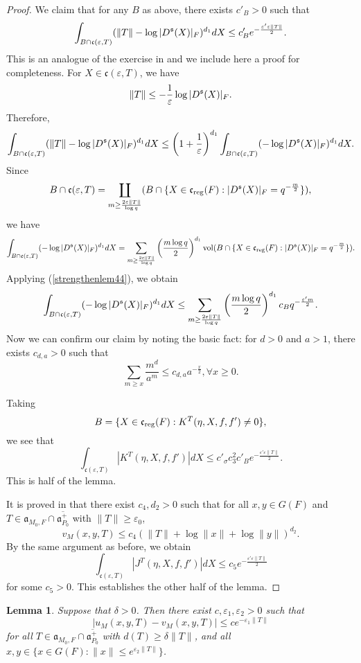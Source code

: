 \documentclass[a4paper]{amsart}
\newcommand{\fa}{{\mathfrak{a}}} \newcommand{\fb}{{\mathfrak{b}}}\newcommand{\fc}{{\mathfrak{c}}} \newcommand{\fd}{{\mathfrak{d}}}
\newcommand{\ov}{\overline}
\newcommand{\vol}{{\mathrm{vol}}}                   \newcommand{\Vol}{{\mathrm{Vol}}}
\newtheorem{lem}[thm]{Lemma}
\theoremstyle{definition}
\theoremstyle{remark}
\numberwithin{equation}{subsection}
\begin{document}
\begin{proof}
We claim that for any $B$ as above, there exists $c'_B>0$ such that
$$ \int_{B\cap\fc(\varepsilon, T)} (\| T\| - \log |D^\fs(X)|_F)^{d_1} dX \leq c'_B e^{-\frac{\varepsilon'\varepsilon\| T\|}{2}}. $$
This is an analogue of the exercise in \cite[p. 32]{MR1114210} and we include here a proof for completeness. For $X\in\fc(\varepsilon,T)$, we have
$$ \|T\|\leq-\frac{1}{\varepsilon}\log|D^{\mathfrak{s}}(X)|_F. $$
Therefore, 
$$ \int_{B\cap\fc(\varepsilon, T)} (\| T\| - \log |D^\fs(X)|_F)^{d_1} dX \leq \left(1+\frac{1}{\varepsilon}\right)^{d_1}\int_{B\cap\fc(\varepsilon, T)} (- \log |D^\fs(X)|_F)^{d_1} dX. $$
Since
$$ B\cap\fc(\varepsilon, T)=\coprod_{m\geq\frac{2\varepsilon\|T\|}{\log q}} (B\cap\{X\in\fc_\reg(F): |D^\fs(X)|_F=q^{-\frac{m}{2}}\}), $$
we have
$$ \int_{B\cap\fc(\varepsilon, T)} (- \log |D^\fs(X)|_F)^{d_1} dX=\sum_{m\geq\frac{2\varepsilon\|T\|}{\log q}} \left(\frac{m\log q}{2}\right)^{d_1} \vol(B\cap\{X\in\fc_\reg(F): |D^\fs(X)|_F=q^{-\frac{m}{2}}\}). $$
Applying (\ref{strengthenlem44}), we obtain
$$ \int_{B\cap\fc(\varepsilon, T)} (- \log |D^\fs(X)|_F)^{d_1} dX \leq \sum_{m\geq\frac{2\varepsilon\|T\|}{\log q}} \left(\frac{m\log q}{2}\right)^{d_1} c_B q^{-\frac{\varepsilon'm}{2}}. $$
Now we can confirm our claim by noting the basic fact: for $d>0$ and $a>1$, there exists $c_{d,a}>0$ such that
$$ \sum_{m\geq x} \frac{m^d}{a^m}\leq c_{d,a}a^{-\frac{x}{2}}, \forall x\geq 0. $$

Taking
$$ B=\{X\in\fc_\reg(F): K^T(\eta, X, f, f')\neq 0\}, $$
we see that
$$ \int_{\fc(\varepsilon, T)} |K^T(\eta, X, f, f')| dX \leq c'_\sigma c_3^2 c'_B e^{-\frac{\varepsilon'\varepsilon\| T\|}{2}}. $$
This is half of the lemma. 

It is proved in \cite[p. 32]{MR1114210} that there exist $c_4,d_2>0$ such that for all $x,y\in G(F)$ and $T\in\fa_{M_0,F}\cap\ov{\fa_{P_0}^+}$ with $\|T\|\geq\varepsilon_0$, 
$$ v_M(x, y, T) \leq c_4 (\| T\| + \log \| x\| + \log \| y\|)^{d_2}. $$
By the same argument as before, we obtain
$$ \int_{\fc(\varepsilon, T)} |J^T(\eta, X, f, f')| dX \leq c_5 e^{-\frac{\varepsilon'\varepsilon\| T\|}{2}} $$
for some $c_5>0$. This establishes the other half of the lemma. 
\end{proof}

\begin{lem}\label{lem4.4}
Suppose that $\delta>0$. Then there exist $c, \varepsilon_1, \varepsilon_2>0$ such that
$$ |u_M(x,y,T)-v_M(x,y,T)|\leq ce^{-\varepsilon_1\|T\|} $$
for all $T\in\fa_{M_0,F}\cap\ov{\fa_{P_0}^+}$ with $d(T)\geq\delta\|T\|$, and all $x,y\in\{x\in G(F): \|x\|\leq e^{\varepsilon_2\|T\|}\}$. 
\end{lem}
\end{document}
